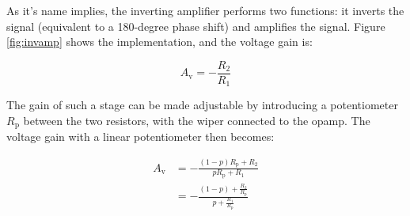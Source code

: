 As it's name implies, the inverting amplifier performs two functions: it
inverts the signal (equivalent to a 180-degree phase shift) and amplifies the
signal\cite{serban}. Figure \ref{fig:invamp} shows the implementation, and the
voltage gain is:

\begin{displaymath}
    A_\text{v} = -\frac{R_2}{R_1}
\end{displaymath}

The gain of such a stage can be made adjustable by introducing a potentiometer
$R_\text{p}$ between the two resistors, with the wiper connected to the
opamp. The voltage gain with a linear potentiometer then becomes:

\begin{equation}\label{eq:invamp-gain}
    \begin{split}
        A_\text{v} &= -\frac{(1-p) R_\text{p} + R_2}{p R_\text{p} + R_1}\\
        &= -\frac{(1-p) + \frac{R_2}{R_\text{p}}}{p + \frac{R_1}{R_\text{p}}}
    \end{split}
\end{equation}

